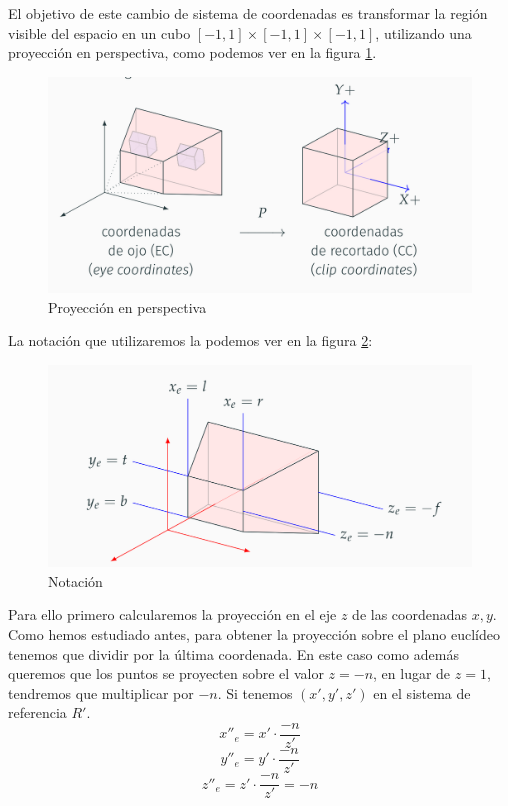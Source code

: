 \documentclass[a4paper,11pt, oneside]{book}
\begin{document}
El objetivo de este cambio de sistema de coordenadas es transformar la región visible del espacio en un cubo $[-1,1]\times [-1,1]\times [-1,1]$, utilizando una proyección en perspectiva, como podemos ver en la figura \ref{fig:perspectiva}.
\begin{figure}[H]
	
	\centering
	\includegraphics[width=0.9\linewidth]{cubo}
	\caption{Proyección en perspectiva}
	\label{fig:perspectiva}
	
\end{figure}

La notación que utilizaremos la podemos ver en la figura \ref{fig:notacion}:
\begin{figure}[H]
	
	\centering
	\includegraphics[width=0.9\linewidth]{notacion}
	\caption{Notación}
	\label{fig:notacion}
	
\end{figure}

Para ello primero calcularemos la proyección en el eje $z$ de las coordenadas $x,y$. Como hemos estudiado antes, para obtener la proyección sobre el plano euclídeo tenemos que dividir por la última coordenada. En este caso como además queremos que los puntos se proyecten sobre el valor $z=-n$, en lugar de $z=1$, tendremos que multiplicar por $-n$. Si tenemos $(x',y',z')$ en el sistema de referencia $R'$.
\begin{equation}
x''_e = x'\cdot\frac{-n}{z'}
\end{equation}
\begin{equation}
y''_e = y'\cdot\frac{-n}{z'}
\end{equation}
\begin{equation}
z''_e = z'\cdot\frac{-n}{z'} = -n
\end{equation}
\end{document}
